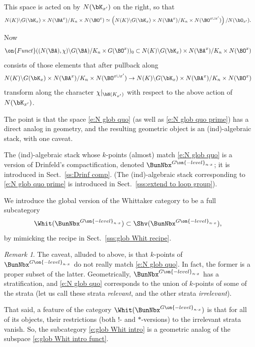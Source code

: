 \documentclass[9pt]{amsart}
\theoremstyle{definition}
\theoremstyle{remark}
\newtheorem{rem}[subsubsection]{Remark}
\newcommand{\secref}[1]{Sect.~\ref{#1}}
\numberwithin{equation}{section}
\begin{document}
\medskip

This space is acted on by $N(\bK_{x'})$ on the right, so that
$$N(K)\backslash G(\bK_x) \times N(\BA^x)/K_n\times N(\BO^x)\simeq 
\left(N(K)\backslash G(\bK_x) \times N(\BA^x)/K_n\times N(\BO^{x\cup x'})\right)/N(\bO_{x'}).$$

Now
\begin{equation} \label{e:glob Whit intro funct}
\on{Funct}((N(\BA),\chi)\backslash G(\BA)/K_n\times G(\BO^x))_0 \subset N(K)\backslash G(\bK_x) \times N(\BA^x)/K_n\times N(\BO^x)
\end{equation}
consists of those elements that after pullback along
$$N(K)\backslash G(\bK_x) \times N(\BA^x)/K_n\times N(\BO^{x\cup x'})\to N(K)\backslash G(\bK_x) \times N(\BA^x)/K_n\times N(\BO^x)$$
transform along the character $\chi|_{\bN(K_{x'})}$ with respect to the above action of $N(\bK_{x'})$. 

\sssec{}

The point is that the space \eqref{e:N glob quo} (as well as \eqref{e:N glob quo prime}) has a direct analog in geometry,
and the resulting geometric object is an (ind)-algebraic stack, with one caveat. 

\medskip

The (ind)-algebraic stack whose $k$-points (almost) match \eqref{e:N glob quo} is a version of Drinfeld's compactification, 
denoted $\BunNbx^{G\on{-level}_{n\cdot x}}$; it is introduced in \secref{ss:Drinf comp}. (The (ind)-algebraic stack corresponding
to \eqref{e:N glob quo prime} is introduced in \secref{sss:extend to loop group}).  

\medskip

We introduce the global version of the Whittaker category to be a full subcategory
\begin{equation} \label{e:glob Whit intro}
\Whit(\BunNbx^{G\on{-level}_{n\cdot x}})\subset \Shv(\BunNbx^{G\on{-level}_{n\cdot x}}),
\end{equation}
by mimicking the recipe in \secref{sss:glob Whit recipe}. 

\begin{rem}

The caveat, alluded to above, is that $k$-points of $\BunNbx^{G\on{-level}_{n\cdot x}}$ do not really match 
\eqref{e:N glob quo}. In fact, the former is a proper subset of the latter. Geometrically, $\BunNbx^{G\on{-level}_{n\cdot x}}$
has a stratification, and \eqref{e:N glob quo} corresponds to the union of $k$-points of some of the strata (let us call these
strata {\it relevant}, and the other strata {\it irrelevant}).

\medskip

That said, a feature of the category $\Whit(\BunNbx^{G\on{-level}_{n\cdot x}})$ is that for all of its objects, their
restrictions (both $!$- and $*$-versions) to the irrelevant strata vanish. So, the subcategory \eqref{e:glob Whit intro}
is a geometric analog of the subspace \eqref{e:glob Whit intro funct}. 

\end{rem}
\end{document}
